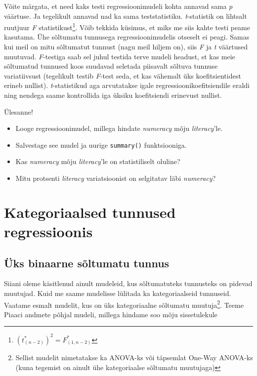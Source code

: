 \documentclass[
]{book}
\providecommand{\tightlist}{%
  \setlength{\itemsep}{0pt}\setlength{\parskip}{0pt}}
\begin{document}
Võite märgata, et need kaks testi regressioonimudeli kohta annavad sama \emph{p} väärtuse. Ja tegelikult annavad nad ka sama teststatistiku. \emph{t}-statistik on lihtsalt ruutjuur \emph{F} statistikust\footnote{\((t^{*}_{(n-2)})^2=F^{*}_{(1,n-2)}\)}. Võib tekkida küsimus, et miks me siis kahte testi peame kasutama. Ühe sõltumatu tunnusega regressioonimudelis otseselt ei peagi. Samas kui meil on mitu sõltumatut tunnust (nagu meil hiljem on), siis \emph{F} ja \emph{t} väärtused muutuvad. \emph{F}-testiga saab sel juhul testida terve mudeli headust, st kas meie sõltumatud tunnused koos suudavad seletada piisavalt sõltuva tunnuse variatiivsust (tegelikult testib \emph{F}-test seda, et kas vähemalt üks koefitsientidest erineb nullist). \emph{t}-statistikud aga arvutatakse igale regressioonikoefitsiendile eraldi ning nendega saame kontrollida iga üksiku koefitsiendi erinevust nullist.

Ülesanne!

\begin{itemize}
\tightlist
\item
  Looge regressioonimudel, millega hindate \emph{numeracy} mõju \emph{literacy}'le.\\
\item
  Salvestage see mudel ja uurige \texttt{summary()} funktsiooniga.
\item
  Kas \emph{numeracy} mõju \emph{literacy}'le on statistiliselt oluline?\\
\item
  Mitu protsenti \emph{literacy} variatsioonist on selgitatav läbi \emph{numeracy}?
\end{itemize}

\hypertarget{kategoriaalsed-tunnused-regressioonis}{%
\section{Kategoriaalsed tunnused regressioonis}\label{kategoriaalsed-tunnused-regressioonis}}

\hypertarget{uxfcks-binaarne-suxf5ltumatu-tunnus}{%
\subsection{Üks binaarne sõltumatu tunnus}\label{uxfcks-binaarne-suxf5ltumatu-tunnus}}

Siiani oleme käsitlenud ainult mudeleid, kus sõltumatuteks tunnusteks on pidevad muutujad. Kuid me saame mudelisse lülitada ka kategoriaalseid tunnuseid. Vaatame esmalt mudelit, kus on üks kategoriaalne sõltumatu muutuja\footnote{Sellist mudelit nimetatakse ka ANOVA-ks või täpsemlat One-Way ANOVA-ks (kuna tegemist on ainult ühe kategoriaalse sõltumatu muutujaga)}. Teeme Piaaci andmete põhjal mudeli, millega hindame soo mõju sissetulekule
\end{document}
